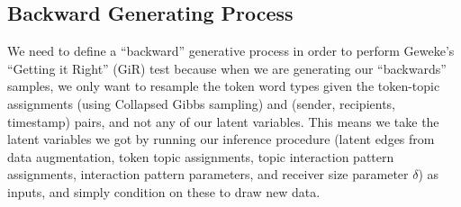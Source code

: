 \documentclass[a4paper]{article}
\begin{document}
       \subsection{Backward Generating Process} \label{subsubsec: Backward Generative Process}
   We need to define a “backward” generative process in order to perform Geweke’s “Getting it Right” (GiR) test because when we are generating our “backwards” samples, we only want to resample the token word types given the token-topic assignments (using Collapsed Gibbs sampling) and (sender, recipients, timestamp) pairs, and not any of
   our latent variables. This means we take the latent variables we got by running our inference procedure (latent edges from data augmentation, token topic assignments, topic interaction pattern assignments, interaction pattern parameters, and receiver size parameter $\delta$) as inputs, and simply condition on these to draw new data. \\
   
\end{document}
